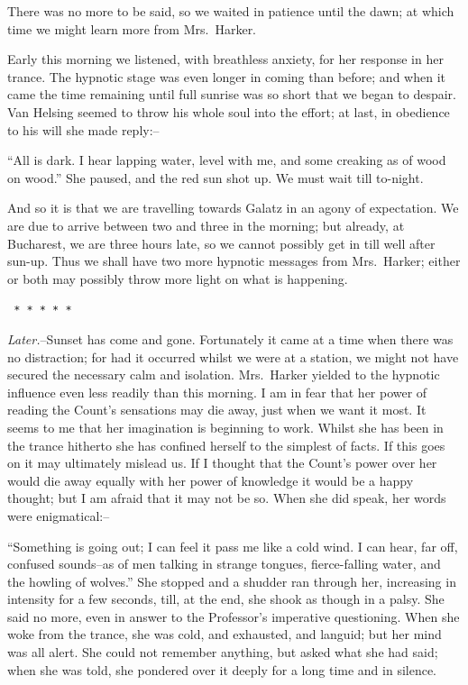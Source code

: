 \documentclass[12pt,openright]{book}
\begin{document}
There was no more to be said, so we waited in patience until the dawn; at which time we might learn more from Mrs. Harker.

Early this morning we listened, with breathless anxiety, for her response in her trance. The hypnotic stage was even longer in coming than before; and when it came the time remaining until full sunrise was so short that we began to despair. Van Helsing seemed to throw his whole soul into the effort; at last, in obedience to his will she made reply:–

“All is dark. I hear lapping water, level with me, and some creaking as of wood on wood.” She paused, and the red sun shot up. We must wait till to-night.

And so it is that we are travelling towards Galatz in an agony of expectation. We are due to arrive between two and three in the morning; but already, at Bucharest, we are three hours late, so we cannot possibly get in till well after sun-up. Thus we shall have two more hypnotic messages from Mrs. Harker; either or both may possibly throw more light on what is happening.

\texttt{   *       *       *       *       *}

\textit{Later.}–Sunset has come and gone. Fortunately it came at a time when there was no distraction; for had it occurred whilst we were at a station, we might not have secured the necessary calm and isolation. Mrs. Harker yielded to the hypnotic influence even less readily than this morning. I am in fear that her power of reading the Count’s sensations may die away, just when we want it most. It seems to me that her imagination is beginning to work. Whilst she has been in the trance hitherto she has confined herself to the simplest of facts. If this goes on it may ultimately mislead us. If I thought that the Count’s power over her would die away equally with her power of knowledge it would be a happy thought; but I am afraid that it may not be so. When she did speak, her words were enigmatical:–

“Something is going out; I can feel it pass me like a cold wind. I can hear, far off, confused sounds–as of men talking in strange tongues, fierce-falling water, and the howling of wolves.” She stopped and a shudder ran through her, increasing in intensity for a few seconds, till, at the end, she shook as though in a palsy. She said no more, even in answer to the Professor’s imperative questioning. When she woke from the trance, she was cold, and exhausted, and languid; but her mind was all alert. She could not remember anything, but asked what she had said; when she was told, she pondered over it deeply for a long time and in silence.
\end{document}
